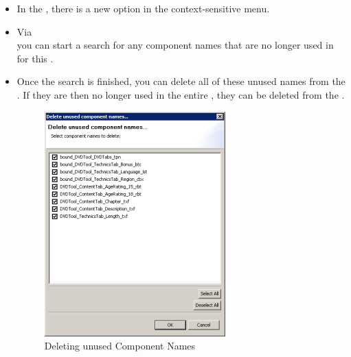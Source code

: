 \begin{itemize}
\item In the \gdomeditor{}, there is a new option in the context-sensitive menu. 
\item Via  \\
you can start a search for any component names that are no longer used in \gdsuites{} for this \gdaut{}. 
\item Once the search is finished, you can delete all of these unused names from the \gdomeditor{}. If they are then no longer used in the entire \gdproject{}, 
they can be deleted from the \gdcompnamebrowser{}. 

\begin{figure}[h]
\begin{center}
\includegraphics{52/ps/DeleteUnusedCompNames}
\caption{Deleting unused Component Names}
\label{RNDeleteUnusedCN}
\end{center}
\end{figure}
		
\end{itemize}

